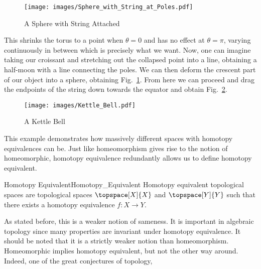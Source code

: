 \documentclass[oneside]{book}                                                  %
\begin{document}
                \begin{figure}[H]
                    \centering
                    \captionsetup{type=figure}
                    \texttt{[image: images/Sphere\_with\_String\_at\_Poles.pdf]}
                    \caption{A Sphere with String Attached}
                    \label{fig:Sphere_with_String_Attached}
                \end{figure}
                This shrinks the torus to a point when $\theta=0$ and has no
                effect at $\theta=\pi$, varying continuously in between which is
                precisely what we want. Now, one can imagine taking our
                croissant and stretching out the collapsed point into a line,
                obtaining a half-moon with a line connecting the poles. We can
                then deform the crescent part of our object into a sphere,
                obtaining Fig.~\ref{fig:Sphere_with_String_Attached}. From here
                we can proceed and drag the endpoints of the string down towards
                the equator and obtain Fig.~\ref{fig:Kettle_Bell}.
                \begin{figure}[H]
                    \centering
                    \captionsetup{type=figure}
                    \texttt{[image: images/Kettle\_Bell.pdf]}
                    \caption{A Kettle Bell}
                    \label{fig:Kettle_Bell}
                \end{figure}
                This example demonstrates how massively different spaces with
                homotopy equivalences can be. Just like homeomorphism gives rise
                to the notion of homeomorphic, homotopy equivalence redundantly
                allows us to define homotopy equivalent.
                \begin{fdefinition}{Homotopy Equivalent}{Homotopy_Equivalent}
                    Homotopy equivalent topological spaces are topological
                    spaces $\topspace[X]{X}$ and $\topspace[Y]{Y}$ such that
                    there exists a homotopy equivalence $f:X\rightarrow{Y}$.
                \end{fdefinition}
                As stated before, this is a weaker notion of sameness. It is
                important in algebraic topology since many properties are
                invariant under homotopy equivalence. It should be noted that it
                is a strictly weaker notion than homeomorphism. Homeomorphic
                implies homotopy equivalent, but not the other way around.
                Indeed, one of the great conjectures of topology,
\end{document}
